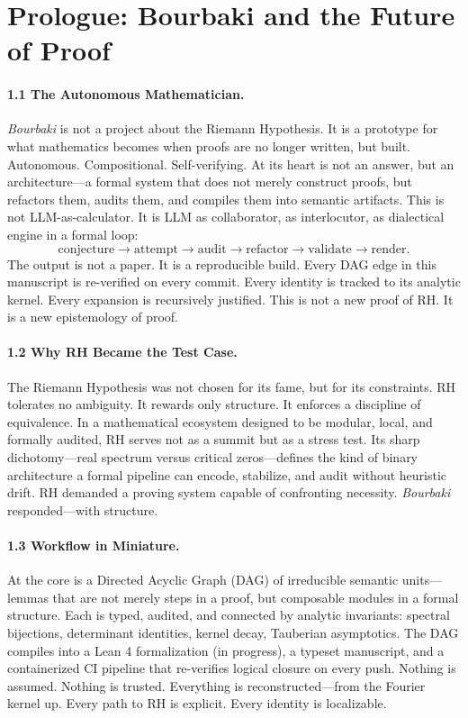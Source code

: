 \section*{Prologue: Bourbaki and the Future of Proof}
\label{sec:prologue}

\paragraph*{1.1 The Autonomous Mathematician.}
\emph{Bourbaki} is not a project about the Riemann Hypothesis. It is a prototype for what mathematics becomes when proofs are no longer written, but built. Autonomous. Compositional. Self-verifying. At its heart is not an answer, but an architecture—a formal system that does not merely construct proofs, but refactors them, audits them, and compiles them into semantic artifacts. This is not LLM-as-calculator. It is LLM as collaborator, as interlocutor, as dialectical engine in a formal loop:
\[
\text{conjecture} \rightarrow \text{attempt} \rightarrow \text{audit} \rightarrow \text{refactor} \rightarrow \text{validate} \rightarrow \text{render}.
\]
The output is not a paper. It is a reproducible build. Every DAG edge in this manuscript is re-verified on every commit. Every identity is tracked to its analytic kernel. Every expansion is recursively justified. This is not a new proof of RH. It is a new epistemology of proof.

\paragraph*{1.2 Why RH Became the Test Case.}
The Riemann Hypothesis was not chosen for its fame, but for its constraints. RH tolerates no ambiguity. It rewards only structure. It enforces a discipline of equivalence. In a mathematical ecosystem designed to be modular, local, and formally audited, RH serves not as a summit but as a stress test. Its sharp dichotomy—real spectrum versus critical zeros—defines the kind of binary architecture a formal pipeline can encode, stabilize, and audit without heuristic drift. RH demanded a proving system capable of confronting necessity. \emph{Bourbaki} responded—with structure.

\paragraph*{1.3 Workflow in Miniature.}
At the core is a Directed Acyclic Graph (DAG) of irreducible semantic units—lemmas that are not merely steps in a proof, but composable modules in a formal structure. Each is typed, audited, and connected by analytic invariants: spectral bijections, determinant identities, kernel decay, Tauberian asymptotics. The DAG compiles into a Lean 4 formalization (in progress), a typeset manuscript, and a containerized CI pipeline that re-verifies logical closure on every push. Nothing is assumed. Nothing is trusted. Everything is reconstructed—from the Fourier kernel up. Every path to RH is explicit. Every identity is localizable.

